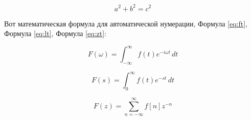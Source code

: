 $$a^2 + b^2 = c^2$$

Вот математическая формула для автоматической нумерации, Формула \ref{eq:ft}, Формула \ref{eq:lt}, Формула \ref{eq:zt}:

\begin{equation}
F(\omega) = \int_{-\infty}^{\infty} f(t) e^{-i\omega t} \, dt
\label{eq:ft}
\end{equation}

\begin{equation}
F(s) = \int_{0}^{\infty} f(t) e^{-st} \, dt
\label{eq:lt}
\end{equation}

\begin{equation}
F(z) = \sum_{n=-\infty}^{\infty} f[n] z^{-n}
\label{eq:zt}
\end{equation}



